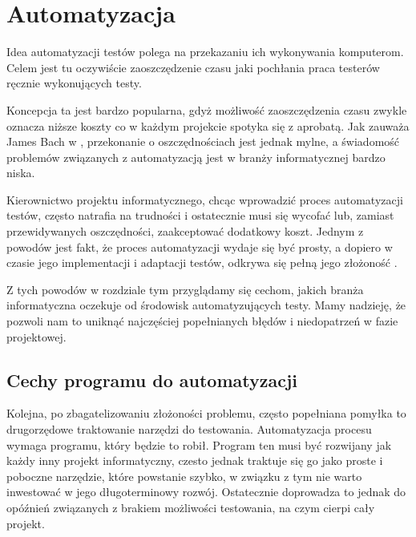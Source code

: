 \documentclass[00-praca-magisterska.tex]{subfiles}
\begin{document}
\chapter{Automatyzacja}
\label{automatyzacja}

Idea automatyzacji testów polega na przekazaniu ich wykonywania komputerom.
Celem jest tu oczywiście zaoszczędzenie czasu jaki pochłania praca testerów
ręcznie wykonujących testy.

Koncepcja ta jest bardzo popularna, gdyż możliwość zaoszczędzenia czasu zwykle
oznacza niższe koszty co w każdym projekcie spotyka się z aprobatą. Jak zauważa
James Bach w \cite{snake-oil}, przekonanie o oszczędnościach jest jednak mylne,
a świadomość problemów związanych z automatyzacją jest w branży informatycznej
bardzo niska.

Kierownictwo projektu informatycznego, chcąc wprowadzić proces automatyzacji
testów, często natrafia na trudności i ostatecznie musi się wycofać lub,
zamiast przewidywanych oszczędności, zaakceptować dodatkowy koszt. Jednym z
powodów jest fakt, że proces automatyzacji wydaje się być prosty, a dopiero w
czasie jego implementacji i adaptacji testów, odkrywa się pełną jego złożoność
\cite{automation-fail}.

Z tych powodów w rozdziale tym przyglądamy się cechom, jakich branża
informatyczna oczekuje od środowisk automatyzujących testy. Mamy nadzieję, że
pozwoli nam to uniknąć najczęściej popełnianych błędów i niedopatrzeń w fazie
projektowej.

\section{Cechy programu do automatyzacji}

Kolejna, po zbagatelizowaniu złożoności problemu, często popełniana pomyłka to
drugorzędowe traktowanie narzędzi do testowania. Automatyzacja procesu wymaga
programu, który będzie to robił.  Program ten musi być rozwijany jak każdy inny
projekt informatyczny, czesto jednak traktuje się go jako proste i poboczne
narzędzie, które powstanie szybko, w związku z tym nie warto inwestować w jego
długoterminowy rozwój.  Ostatecznie doprowadza to jednak do opóźnień związanych
z brakiem możliwości testowania, na czym cierpi cały projekt.  
\end{document}
